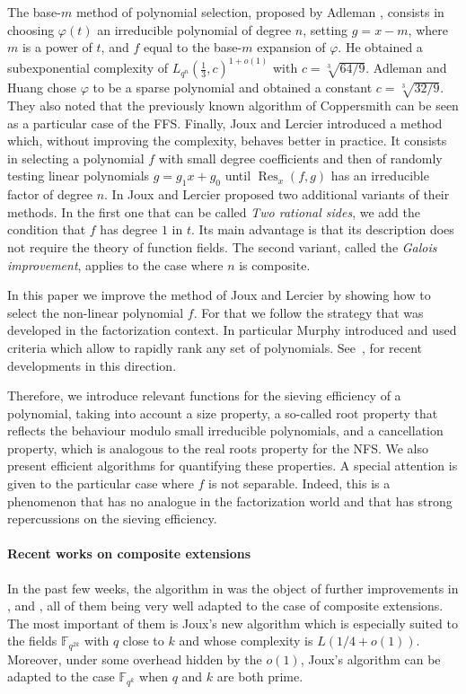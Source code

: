 \documentclass[a4wide]{article}
\newcommand{\F}{{\mathbb F}}
\DeclareMathOperator{\Res}{Res}
\theoremstyle{plain}
\theoremstyle{definition}
\theoremstyle{remark}
\begin{document}
The base-$m$ method of polynomial selection, proposed by Adleman \cite{Ad94}, consists in
choosing $\varphi(t)$ an irreducible polynomial of degree $n$, setting
$g=x-m$, where $m$ is a power of $t$, and $f$ equal to the base-$m$
expansion of $\varphi$. He obtained a subexponential complexity of
$L_{q^n}(\frac{1}{3},c)^{1+o(1)}$ with $c=\sqrt[3]{64/9}$. Adleman and
Huang \cite{AdHu99} chose $\varphi$ to be a sparse polynomial and obtained a constant $c=\sqrt[3]{32/9}$. They
also noted that the previously known algorithm of Coppersmith \cite{Cop84} can be seen as a particular case of the FFS. Finally, Joux and
Lercier \cite{JoLe02} introduced a method which, without improving the
complexity, behaves better in practice. It consists in selecting a
polynomial $f$ with small degree coefficients and then of randomly testing linear polynomials $g=g_1x+g_0$ until $\Res_x(f,g)$ has an irreducible factor
of degree $n$. 
In \cite{JoLe06} Joux and Lercier proposed two additional variants of
their methods. In the first one that can be called {\em Two rational
sides}, we add the condition that $f$ has degree $1$ in $t$. Its main
advantage is that its description does not require
the theory of function fields. The second variant, called the {\em Galois
improvement}, applies to the case where $n$ is composite.


In this paper we improve the method of Joux and Lercier
\cite{JoLe02} by showing how to select the non-linear polynomial $f$.
For that we follow the strategy that was developed 
in the factorization context. In particular Murphy
\cite{Mur99} introduced and used criteria which allow
to rapidly rank any set of polynomials.  See~\cite{Bai11}, for recent developments
in this direction.

Therefore, we introduce relevant functions for the sieving efficiency of
a polynomial, taking into account a size property, a so-called root
property that reflects the behaviour modulo small irreducible
polynomials, and a cancellation property, which is analogous to the real
roots property for the NFS. We also present efficient algorithms for
quantifying these properties. A special attention is given to the
particular case where $f$ is not separable. Indeed, this is a phenomenon
that has no analogue in the factorization world and that has strong
repercussions on the sieving efficiency.

\paragraph{Recent works on composite extensions} In the past few weeks,
the algorithm in \cite{JoLe06} was the object of further improvements in
\cite{Jo12}, \cite{GGMZ13} and \cite{Jo13}, all of them being very well
adapted to the case of composite extensions. The most important of them is
Joux's new algorithm which is especially suited to the fields $\F_{q^{2k}}$
with $q$ close to $k$ and whose complexity is $L(1/4+o(1))$. Moreover, under
some overhead hidden by the $o(1)$, Joux's algorithm can be adapted to the case
$\F_{q^k}$ when $q$ and $k$ are both prime. 
\end{document}
